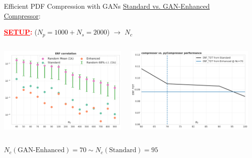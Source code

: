 \begin{frame}{Efficient PDF Compression with GANs}
	\underline{Standard vs. GAN-Enhanced Compressor}:
	\begin{center}
		\textcolor{red}{\textbf{\underline{SETUP}:}} ($N_p=1000 + N_s=2000$) 
		$\longrightarrow$ $N_c$
	\end{center}
	\begin{columns}[T] 
	\begin{column}{.5\textwidth}
	\includegraphics[width=\linewidth]{./gan_compressor/imgs/erf-validation.pdf}
	\end{column}
	\begin{column}{.5\textwidth}	
	\includegraphics[width=\linewidth]{./gan_compressor/imgs/performance.pdf}
	\end{column}
	\end{columns}
	\begin{center}
	\begin{tcolorbox}[width=9.5cm, halign=center, colframe=HallowGreen]
		$N_c (\text{GAN-Enhanced})=70 \sim N_c (\text{Standard})=95$
	\end{tcolorbox}
	\end{center}
\end{frame}
